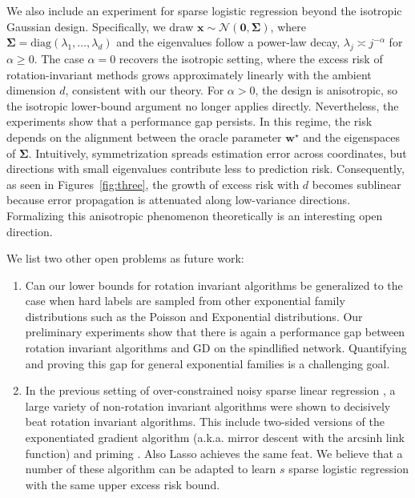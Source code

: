 \documentclass{article}
\theoremstyle{plain}
\theoremstyle{definition}
\theoremstyle{remark}
\begin{document}
{We also include an experiment for sparse logistic regression beyond the isotropic Gaussian design. Specifically, we draw
$\mathbf{x} \sim \mathcal{N}(\mathbf{0},\boldsymbol{\Sigma})$, where
$\boldsymbol{\Sigma} = \mathrm{diag}(\lambda_1,\ldots,\lambda_d)$ and the eigenvalues follow a power-law decay,
$\lambda_j \asymp j^{-\alpha}$ for $\alpha \geq 0$. The case $\alpha=0$ recovers the isotropic setting, where the excess risk of rotation-invariant methods grows approximately linearly with the ambient dimension $d$, consistent with our theory. For $\alpha>0$, the design is anisotropic, so the isotropic lower-bound argument no longer applies directly. Nevertheless, the experiments show that a performance gap persists. In this regime, the risk depends on the alignment between the oracle parameter $\mathbf{w}^{\star}$ and the eigenspaces of $\boldsymbol{\Sigma}$. Intuitively, symmetrization spreads estimation error across coordinates, but directions with small eigenvalues contribute less to prediction risk. Consequently, as seen in Figures~\ref{fig:three}, the growth of excess risk with $d$ becomes sublinear because error propagation is attenuated along low-variance directions. Formalizing this anisotropic phenomenon theoretically is an interesting open direction.

We list two other open problems as future work:

\begin{enumerate}
[leftmargin=*,itemsep=0pt,topsep=1pt]

\item Can our lower bounds for rotation invariant
    algorithms be generalized to the case when hard
labels are sampled from other exponential family
distributions such as the Poisson and Exponential distributions. 
Our preliminary experiments show that there is again a
performance gap between rotation invariant algorithms and GD on the spindlified network.
Quantifying and proving this gap for general exponential families is a challenging goal.
\item In the previous setting of over-constrained noisy sparse 
linear regression \cite{pmlr-v272-warmuth25a},
a large variety of non-rotation invariant algorithms were shown to decisively
beat rotation invariant algorithms.
This include two-sided versions of the exponentiated
	gradient algorithm (a.k.a. mirror descent with the
	$\mathrm{arcsinh}$ link function) and priming \cite{priming}.
Also Lasso achieves the same feat. We believe that a number
of these algorithm can be adapted to learn $s$ sparse
logistic regression with the same upper excess risk bound. 
\end{enumerate}

}
\end{document}
